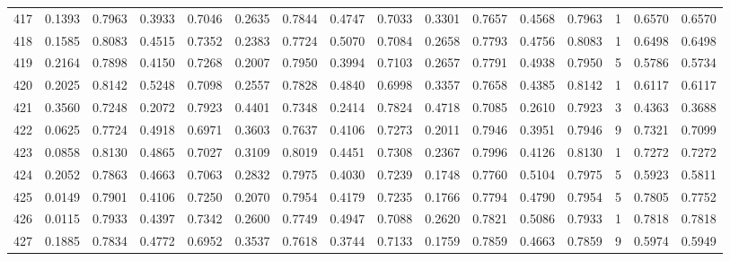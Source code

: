 \begin{tabular}{lrrrrrrrrrrrrrrr}
417 &      0.1393 &  0.7963 &  0.3933 &  0.7046 &  0.2635 &  0.7844 &  0.4747 &  0.7033 &  0.3301 &  0.7657 &   0.4568 &     0.7963 &      1 &                    0.6570 &                     0.6570 \\
418 &      0.1585 &  0.8083 &  0.4515 &  0.7352 &  0.2383 &  0.7724 &  0.5070 &  0.7084 &  0.2658 &  0.7793 &   0.4756 &     0.8083 &      1 &                    0.6498 &                     0.6498 \\
419 &      0.2164 &  0.7898 &  0.4150 &  0.7268 &  0.2007 &  0.7950 &  0.3994 &  0.7103 &  0.2657 &  0.7791 &   0.4938 &     0.7950 &      5 &                    0.5786 &                     0.5734 \\
420 &      0.2025 &  0.8142 &  0.5248 &  0.7098 &  0.2557 &  0.7828 &  0.4840 &  0.6998 &  0.3357 &  0.7658 &   0.4385 &     0.8142 &      1 &                    0.6117 &                     0.6117 \\
421 &      0.3560 &  0.7248 &  0.2072 &  0.7923 &  0.4401 &  0.7348 &  0.2414 &  0.7824 &  0.4718 &  0.7085 &   0.2610 &     0.7923 &      3 &                    0.4363 &                     0.3688 \\
422 &      0.0625 &  0.7724 &  0.4918 &  0.6971 &  0.3603 &  0.7637 &  0.4106 &  0.7273 &  0.2011 &  0.7946 &   0.3951 &     0.7946 &      9 &                    0.7321 &                     0.7099 \\
423 &      0.0858 &  0.8130 &  0.4865 &  0.7027 &  0.3109 &  0.8019 &  0.4451 &  0.7308 &  0.2367 &  0.7996 &   0.4126 &     0.8130 &      1 &                    0.7272 &                     0.7272 \\
424 &      0.2052 &  0.7863 &  0.4663 &  0.7063 &  0.2832 &  0.7975 &  0.4030 &  0.7239 &  0.1748 &  0.7760 &   0.5104 &     0.7975 &      5 &                    0.5923 &                     0.5811 \\
425 &      0.0149 &  0.7901 &  0.4106 &  0.7250 &  0.2070 &  0.7954 &  0.4179 &  0.7235 &  0.1766 &  0.7794 &   0.4790 &     0.7954 &      5 &                    0.7805 &                     0.7752 \\
426 &      0.0115 &  0.7933 &  0.4397 &  0.7342 &  0.2600 &  0.7749 &  0.4947 &  0.7088 &  0.2620 &  0.7821 &   0.5086 &     0.7933 &      1 &                    0.7818 &                     0.7818 \\
427 &      0.1885 &  0.7834 &  0.4772 &  0.6952 &  0.3537 &  0.7618 &  0.3744 &  0.7133 &  0.1759 &  0.7859 &   0.4663 &     0.7859 &      9 &                    0.5974 &                     0.5949 \\

\end{tabular}
